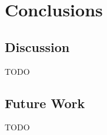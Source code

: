 \documentclass[logo,bsc,singlespacing,parskip,online]{infthesis}
\begin{document}





\chapter{Conclusions}
\section{Discussion}
% 
TODO
\section{Future Work}
TODO












\end{document}
